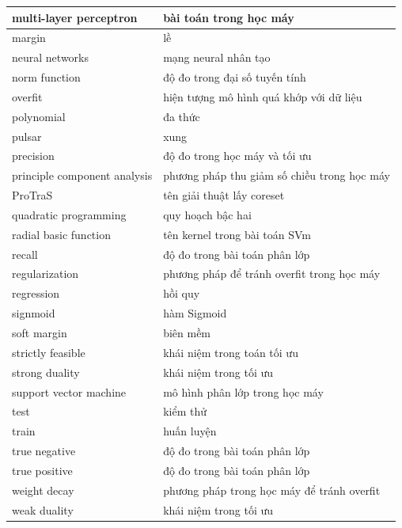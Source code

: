 \documentclass[a4paper, 12pt, oneside]{report}
\begin{document}
\begin{titlepage}
\begin{longtable}[htp]{|l|l|}
\hline
multi-layer perceptron & bài toán trong học máy \\
\hline
margin & lề\\
\hline
neural networks & mạng neural nhân tạo\\
\hline
norm function& độ đo trong đại số tuyến tính\\
\hline
overfit & hiện tượng mô hình quá khớp với dữ liệu\\
\hline
polynomial & đa thức\\
\hline
pulsar & xung\\
\hline
precision & độ đo trong học máy và tối ưu\\
\hline
principle component analysis & phương pháp thu giảm số chiều trong học máy \\ 
\hline
ProTraS & tên giải thuật lấy coreset\\
\hline
quadratic programming & quy hoạch bậc hai\\
\hline
radial basic function & tên kernel trong bài toán SVm \\
recall & độ đo trong bài toán phân lớp\\
\hline
regularization & phương pháp để tránh overfit trong học máy\\
\hline
regression & hồi quy\\
\hline
signmoid & hàm Sigmoid\\
\hline
soft margin & biên mềm\\
\hline
strictly feasible & khái niệm trong toán tối ưu\\
\hline
strong duality & khái niệm trong tối ưu\\
\hline
support vector machine & mô hình phân lớp trong học máy\\
\hline
test & kiểm thử\\
\hline
train & huấn luyện\\
\hline
true negative & độ đo trong bài toán phân lớp\\
\hline
true positive & độ đo trong bài toán phân lớp\\
\hline
weight decay & phương pháp trong học máy để tránh overfit\\
\hline
weak duality & khái niệm trong tối ưu\\
\hline
\end{longtable}
\end{titlepage}
\end{document}
